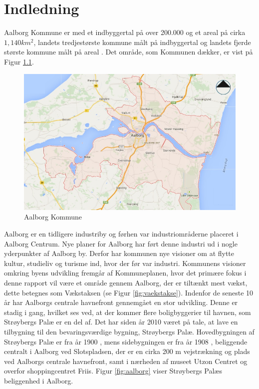 \chapter{Indledning}
Aalborg Kommune er med et indbyggertal på over 200.000 og et areal på cirka  $1,\!140 km^2$, landets tredjestørste kommune målt på indbyggertal \citep{kommunedata} og landets fjerde største kommune målt på areal \citep{kommunedata}. Det område, som Kommunen dækker, er vist på Figur \ref{fig:aalborgkommune}. 

\begin{figure}[htbp]
	\includegraphics[width=1.0\textwidth]{billeder/aalborgkommune.png}
	\caption{Aalborg Kommune}
	\label{fig:aalborgkommune}
\end{figure}

\indent{     }  Aalborg er en tidligere industriby og førhen var industriområderne placeret i Aalborg Centrum. Nye planer for Aalborg har ført denne industri ud i nogle yderpunkter af Aalborg by. Derfor har kommunen nye visioner om at flytte kultur, studieliv og turisme ind, hvor der før var industri. Kommunens visioner omkring byens udvikling fremgår af Kommuneplanen, hvor det primære fokus i denne rapport vil være et område gennem Aalborg, der er tiltænkt mest vækst, dette betegnes som Vækstaksen (se Figur \ref{fig:vaekstakse}).
\newline \indent{     }  Indenfor de seneste 10 år har Aalborgs centrale havnefront gennemgået en stor udvikling. Denne er stadig i gang, hvilket ses ved, at der kommer flere boligbyggerier til havnen, som Strøybergs Palæ er en del af. 
\newline \indent{     }  Det har siden år 2010 været på tale, at lave en tilbygning til den bevaringsværdige bygning, Strøybergs Palæ. Hovedbygningen af Strøybergs Palæ er fra år 1900 \citep{hovedbygning}, mens sidebygningen er fra år 1908 \citep{sidebygning}, beliggende centralt i Aalborg ved Slotspladsen, der er en cirka 200 m vejstrækning og plads ved Aalborgs centrale havnefront, samt i nærheden af museet Utzon Centret og overfor shoppingcentret Friis. Figur \ref{fig:aalborg} viser Strøybergs Palæs beliggenhed i Aalborg. 


